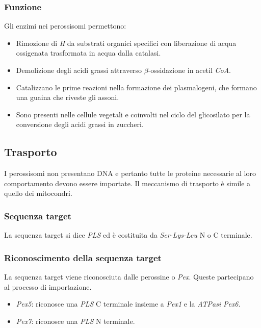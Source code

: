 		\subsubsection{Funzione}
		Gli enzimi nei perossisomi permettono:
		\begin{multicols}{2}
			\begin{itemize}
				\item Rimozione di \emph{H} da substrati organici specifici con liberazione di acqua ossigenata trasformata in acqua dalla catalasi.
				\item Demolizione degli acidi grassi attraverso $\beta$-ossidazione in acetil \emph{CoA}.
				\item Catalizzano le prime reazioni nella formazione dei plasmalogeni, che formano una guaina che riveste gli assoni.
				\item Sono presenti nelle cellule vegetali e coinvolti nel ciclo del glicosilato per la conversione degli acidi grassi in zuccheri.
			\end{itemize}
		\end{multicols}

	\subsection{Trasporto}
	I perossisomi non presentano DNA e pertanto tutte le proteine necessarie al loro comportamento devono essere importate.
	Il meccanismo di trasporto \`e simile a quello dei mitocondri.

		\subsubsection{Sequenza target}
		La sequenza target si dice \emph{PLS} ed \`e costituita da \emph{Ser-Lys-Leu} N o C terminale.

		\subsubsection{Riconoscimento della sequenza target}
		La sequenza target viene riconosciuta dalle perossine o \emph{Pex}.
		Queste partecipano al processo di importazione.
		\begin{multicols}{2}
			\begin{itemize}
				\item \emph{Pex5}: riconosce una \emph{PLS} C terminale insieme a \emph{Pex1} e la \emph{ATPasi} \emph{Pex6}.
				\item \emph{Pex7}: riconosce una \emph{PLS} N terminale.
			\end{itemize}
		\end{multicols}

